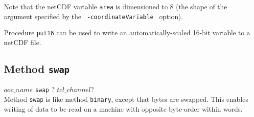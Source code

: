 Note that the netCDF variable 
  \texttt{area} is dimensioned to 8 (the shape of the argument
  specified by the 
  \mbox{
    \texttt{-coordinateVariable}
  } option).
  

Procedure 
  \href{bin-io.html\#put16}{ \texttt{put16} } can be used to write an automatically-scaled 16-bit variable to
  a netCDF file.
  \subsection{
    \label{swap}Method \texttt{swap}
  }

  


  $ooc\_name$ 
  \texttt{swap} ?
  $tcl\_channel$?
  \\
  

Method 
  \texttt{swap} is like method 
  \texttt{binary}, except that bytes are swapped. This enables
  writing of data to be read on a machine with opposite byte-order
  within words.
